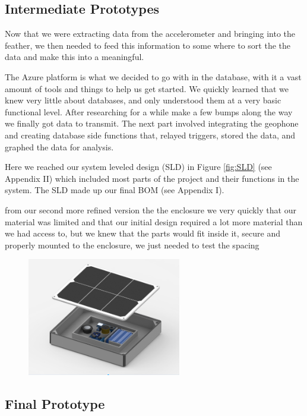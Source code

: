 \documentclass[11pt]{article}
\begin{document}
\subsection{Intermediate Prototypes}


Now that we were extracting data from the accelerometer and bringing into the feather, we then needed to feed this information to some where to sort the the data and make this into a meaningful.  
	
    The Azure platform is what we decided to go with in the database, with it a vast amount of tools and things to help us get started. We quickly learned that we knew very little about databases, and only understood them at a very basic functional level. After researching for a while make a few bumps along the way we finally got data to transmit. The next part involved integrating the geophone and creating database side functions that, relayed triggers, stored the data, and graphed the data for analysis.  
	
    Here we reached our system leveled design (SLD) in Figure \ref{fig:SLD} (see Appendix II) which included most parts of the project and their functions in the system. The SLD made up our final BOM (see Appendix I).
	
    from our second more refined version the the enclosure we very quickly that our material was limited and that our initial design required a lot more material than we had access to, but we knew that the parts would fit inside it, secure and properly mounted to the enclosure, we just needed to test the spacing 
\begin{figure}[H]
\centering
\includegraphics[width=0.6\textwidth]{beta_enclosure}
\caption{}
\label{fig:beta_enclosure}
\end{figure}
\subsection{Final Prototype}
\end{document}
